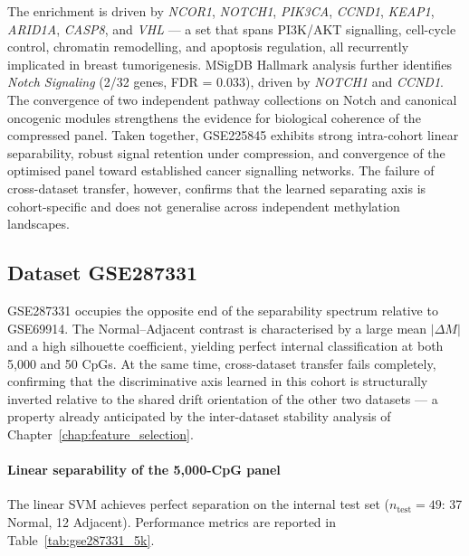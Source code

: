 The enrichment is driven by \textit{NCOR1}, \textit{NOTCH1},
\textit{PIK3CA}, \textit{CCND1}, \textit{KEAP1},
\textit{ARID1A}, \textit{CASP8}, and \textit{VHL} — a set
that spans PI3K/AKT signalling, cell-cycle control, chromatin
remodelling, and apoptosis regulation, all recurrently
implicated in breast tumorigenesis. MSigDB Hallmark analysis
further identifies \textit{Notch Signaling} (2/32 genes,
FDR = 0.033), driven by \textit{NOTCH1} and \textit{CCND1}.
The convergence of two independent pathway collections on
Notch and canonical oncogenic modules strengthens the
evidence for biological coherence of the compressed panel.
Taken together, GSE225845 exhibits strong intra-cohort linear
separability, robust signal retention under compression, and
convergence of the optimised panel toward established cancer
signalling networks. The failure of cross-dataset transfer,
however, confirms that the learned separating axis is
cohort-specific and does not generalise across independent
methylation landscapes.

\subsection{Dataset GSE287331}
\label{sec:results_gse287331}

GSE287331 occupies the opposite end of the separability
spectrum relative to GSE69914. The Normal--Adjacent contrast
is characterised by a large mean $|\Delta M|$ and a high
silhouette coefficient, yielding perfect internal
classification at both 5,000 and 50 CpGs. At the same time,
cross-dataset transfer fails completely, confirming that the
discriminative axis learned in this cohort is structurally
inverted relative to the shared drift orientation of the
other two datasets — a property already anticipated by the
inter-dataset stability analysis of
Chapter~\ref{chap:feature_selection}.

\paragraph{Linear separability of the 5,000-CpG panel}

The linear SVM achieves perfect separation on the internal
test set ($n_{\mathrm{test}} = 49$: 37 Normal, 12 Adjacent).
Performance metrics are reported in
Table~\ref{tab:gse287331_5k}.

